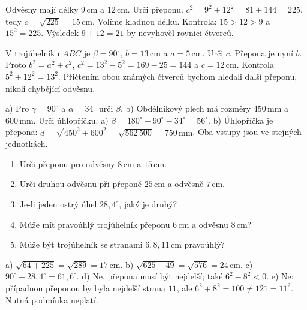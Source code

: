 \documentclass[11pt,a4paper]{article}
\begin{document}
\begin{prikladReseniBox}[title={P1: určujeme přeponu},breakable=false]
Odvěsny mají délky $9\,\mathrm{cm}$ a $12\,\mathrm{cm}$. Urči přeponu.
\tcblower
$c^2=9^2+12^2=81+144=225$, tedy $c=\sqrt{225}=15\,\mathrm{cm}$.
Volíme kladnou délku. Kontrola: $15>12>9$ a $15^2=225$.
Výsledek $9+12=21$ by nevyhověl rovnici čtverců.
\end{prikladReseniBox}
\begin{prikladReseniBox}[title={P2: určujeme odvěsnu},breakable=false]
V trojúhelníku $ABC$ je $\beta=90^\circ$, $b=13\,\mathrm{cm}$ a $a=5\,\mathrm{cm}$.
Urči $c$.
\tcblower
Přepona je nyní $b$. Proto $b^2=a^2+c^2$,
$c^2=13^2-5^2=169-25=144$ a $c=12\,\mathrm{cm}$.
Kontrola $5^2+12^2=13^2$. Přičtením obou známých čtverců bychom hledali další přeponu,
nikoli chybějící odvěsnu.
\end{prikladReseniBox}
\begin{prikladReseniBox}[title={P3: úhel a technický rozměr},breakable=false]
a) Pro $\gamma=90^\circ$ a $\alpha=34^\circ$ urči $\beta$.
b) Obdélníkový plech má rozměry $450\,\mathrm{mm}$ a $600\,\mathrm{mm}$. Urči úhlopříčku.
\tcblower
a) $\beta=180^\circ-90^\circ-34^\circ=56^\circ$.
b) Úhlopříčka je přepona: $d=\sqrt{450^2+600^2}
=\sqrt{562\,500}=750\,\mathrm{mm}$. Oba vstupy jsou ve stejných jednotkách.
\end{prikladReseniBox}

\begin{zadaniReseniBox}[title={S1: vyber správnou stranu},breakable=false]
\begin{enumerate}[label=\alph*)]
\item Urči přeponu pro odvěsny $8\,\mathrm{cm}$ a $15\,\mathrm{cm}$.
\item Urči druhou odvěsnu při přeponě $25\,\mathrm{cm}$ a odvěsně $7\,\mathrm{cm}$.
\item Je-li jeden ostrý úhel $28{,}4^\circ$, jaký je druhý?
\item Může mít pravoúhlý trojúhelník přeponu $6\,\mathrm{cm}$ a odvěsnu $8\,\mathrm{cm}$?
\item Může být trojúhelník se stranami $6,8,11\,\mathrm{cm}$ pravoúhlý?
\end{enumerate}
\tcblower
a) $\sqrt{64+225}=\sqrt{289}=17\,\mathrm{cm}$.
b) $\sqrt{625-49}=\sqrt{576}=24\,\mathrm{cm}$.
c) $90^\circ-28{,}4^\circ=61{,}6^\circ$.
d) Ne, přepona musí být nejdelší; také $6^2-8^2<0$.
e) Ne: případnou přeponou by byla nejdelší strana $11$, ale
$6^2+8^2=100\ne121=11^2$. Nutná podmínka neplatí.
\end{zadaniReseniBox}
\end{document}
